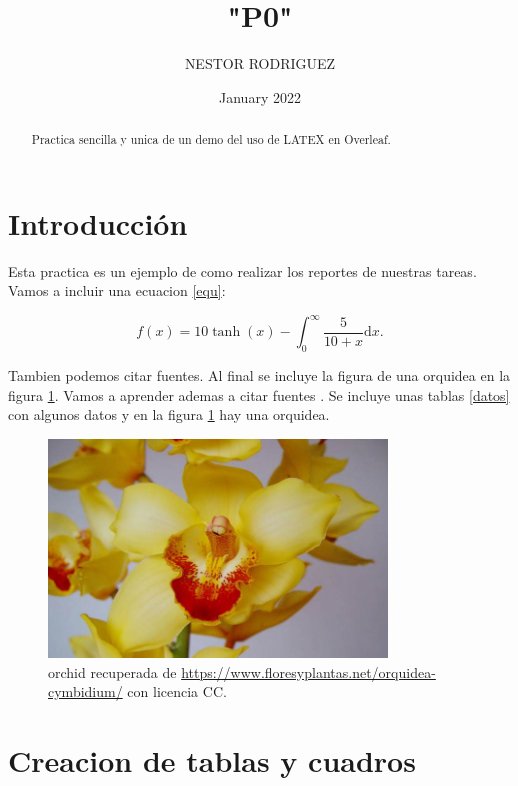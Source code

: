 \documentclass{article}
\title{"P0"} %
\author{NESTOR RODRIGUEZ} %
\date{January 2022}
\begin{document}

\maketitle %

\begin{abstract} %
  Practica sencilla y unica de un demo del uso de LATEX en
  Overleaf.
\end{abstract}

\section{Introducci\'{o}n}\label{intro} %



Esta practica es un ejemplo de como realizar los reportes de nuestras tareas. Vamos a incluir una ecuacion \eqref{equ}:

\begin{equation}
  f(x) = 10 \tanh(x) - \int_0^\infty \frac{5}{10 + x} \text{d}x.
  \label{equ}
\end{equation}

Tambien podemos citar fuentes. Al final se incluye la figura de una orquidea en la figura \ref{flor}. Vamos a aprender ademas a citar fuentes \citep{ejemplo}.
Se incluye unas tablas \ref{datos} con algunos datos y en la figura \citep{imagen} \ref{flor} hay una orquidea.

\begin{figure} %
    \centering
    \includegraphics[width=90mm]{orchid.jpg} %
    \caption{orchid recuperada de \url{https://www.floresyplantas.net/orquidea-cymbidium/} con licencia CC.}
    \label{flor}
\end{figure}

\newpage

\section{Creacion de tablas y cuadros}
\end{document}

